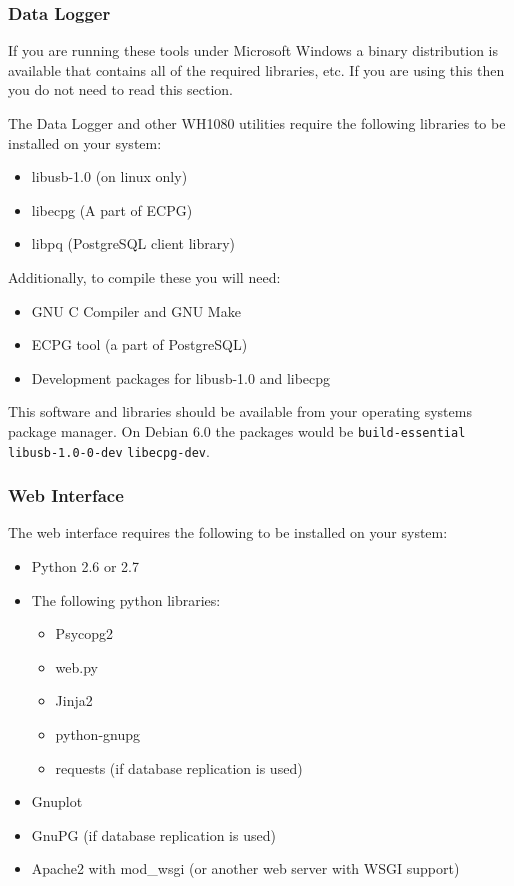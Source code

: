 \documentclass[a4paper,10pt,draft]{book}
\begin{document}
\subsubsection{Data Logger}

If you are running these tools under Microsoft Windows a binary distribution is available that contains all of the required libraries, etc. If you are using this then you do not need to read this section.

The Data Logger and other WH1080 utilities require the following libraries to be installed on your system:
\begin{itemize}
\item libusb-1.0 (on linux only)
\item libecpg (A part of ECPG)
\item libpq (PostgreSQL client library)
\end{itemize}

Additionally, to compile these you will need:
\begin{itemize}
\item GNU C Compiler and GNU Make
\item ECPG tool (a part of PostgreSQL)
\item Development packages for libusb-1.0 and libecpg
\end{itemize}

This software and libraries should be available from your operating systems package manager. On Debian 6.0 the packages would be \verb|build-essential| \verb|libusb-1.0-0-dev| \verb|libecpg-dev|.

\subsubsection{Web Interface}
The web interface requires the following to be installed on your system:
\begin{itemize}
\item Python 2.6 or 2.7
\item The following python libraries: 
\begin{itemize}
\item Psycopg2
\item web.py
\item Jinja2
\item python-gnupg
\item requests (if database replication is used)
\end{itemize}
\item Gnuplot
\item GnuPG (if database replication is used)
\item Apache2 with mod\_wsgi (or another web server with WSGI support)
\end{itemize}
\end{document}
